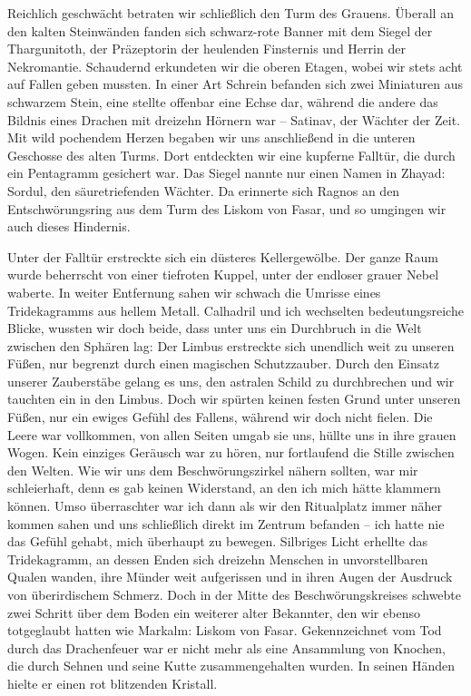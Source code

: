 Reichlich geschwächt betraten wir schließlich den Turm des Grauens. Überall an den kalten Steinwänden fanden sich schwarz-rote Banner mit dem Siegel der Thargunitoth, der Präzeptorin der heulenden Finsternis und Herrin der Nekromantie. Schaudernd erkundeten wir die oberen Etagen, wobei wir stets acht auf Fallen geben mussten. In einer Art Schrein befanden sich zwei Miniaturen aus schwarzem Stein, eine stellte offenbar eine Echse dar, während die andere das Bildnis eines Drachen mit dreizehn Hörnern war -- Satinav, der Wächter der Zeit. Mit wild pochendem Herzen begaben wir uns anschließend in die unteren Geschosse des alten Turms. Dort entdeckten wir eine kupferne Falltür, die durch ein Pentagramm gesichert war. Das Siegel nannte nur einen Namen in Zhayad: Sordul, den säuretriefenden Wächter. Da erinnerte sich Ragnos an den Entschwörungsring aus dem Turm des Liskom von Fasar, und so umgingen wir auch dieses Hindernis.\par

Unter der Falltür erstreckte sich ein düsteres Kellergewölbe. Der ganze Raum wurde beherrscht von einer tiefroten Kuppel, unter der endloser grauer Nebel waberte. In weiter Entfernung sahen wir schwach die Umrisse eines Tridekagramms aus hellem Metall. Calhadril und ich wechselten bedeutungsreiche Blicke, wussten wir doch beide, dass unter uns ein Durchbruch in die Welt zwischen den Sphären lag: Der Limbus erstreckte sich unendlich weit zu unseren Füßen, nur begrenzt durch einen magischen Schutzzauber. Durch den Einsatz unserer Zauberstäbe gelang es uns, den astralen Schild zu durchbrechen und wir tauchten ein in den Limbus. Doch wir spürten keinen festen Grund unter unseren Füßen, nur ein ewiges Gefühl des Fallens, während wir doch nicht fielen. Die Leere war vollkommen, von allen Seiten umgab sie uns, hüllte uns in ihre grauen Wogen. Kein einziges Geräusch war zu hören, nur fortlaufend die Stille zwischen den Welten. Wie wir uns dem Beschwörungszirkel nähern sollten, war mir schleierhaft, denn es gab keinen Widerstand, an den ich mich hätte klammern können. Umso überraschter war ich dann als wir den Ritualplatz immer näher kommen sahen und uns schließlich direkt im Zentrum befanden -- ich hatte nie das Gefühl gehabt, mich überhaupt zu bewegen. Silbriges Licht erhellte das Tridekagramm, an dessen Enden sich dreizehn Menschen in unvorstellbaren Qualen wanden, ihre Münder weit aufgerissen und in ihren Augen der Ausdruck von überirdischem Schmerz. Doch in der Mitte des Beschwörungskreises schwebte zwei Schritt über dem Boden ein weiterer alter Bekannter, den wir ebenso totgeglaubt hatten wie Markalm: Liskom von Fasar. Gekennzeichnet vom Tod durch das Drachenfeuer war er nicht mehr als eine Ansammlung von Knochen, die durch Sehnen und seine Kutte zusammengehalten wurden. In seinen Händen hielte er einen rot blitzenden Kristall. \par

